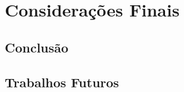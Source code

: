 \chapter{Considerações Finais} \label{cap:cap8}

\section{Conclusão}
\label{sec:conclusão}

\section{Trabalhos Futuros}
\label{sec:trabFuturo}